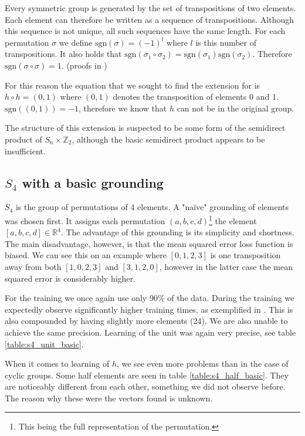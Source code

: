 Every symmetric group is generated by the set of transpositions of two elements. Each element can therefore be written as a sequence of transpositions. Although this sequence is not unique, all such sequences have the same length. For each permutation $\sigma$ we define $\text{sgn}(\sigma)=(-1)^l$ where $l$ is this number of transpositions. It also holds that $\text{sgn}(\sigma_1\circ\sigma_2)=\text{sgn}(\sigma_1)\text{sgn}(\sigma_2)$. Therefore $\text{sgn}(\sigma\circ\sigma)=1$. (proofs in \cite{Lingebra})

For this reason the equation that we sought to find the extension for is $h\circ h=(0,1)$ where $(0,1)$ denotes the transposition of elements $0$ and $1$. $\text{sgn}((0,1))=-1$, therefore we know that $h$ can not be in the original group. 

The structure of this extension is suspected to be some form of the semidirect product of $S_n\times\mathbb{Z}_2$, although the basic semidirect product appears to be insufficient.

\subsection{$S_4$ with a basic grounding}

$S_4$ is the group of permutations of 4 elements. A "na\"{i}ve" grounding of elements was chosen first. It assigns each permutation $(a,b,c,d)$\footnote{This being the full representation of the permutation.} the element $[a,b,c,d]\in\mathbb{R}^4$. The advantage of this grounding is its simplicity and shortness. The main disadvantage, however, is that the mean squared error loss function is biased. We can see this on an example where $[0,1,2,3]$ is one transposition away from both $[1,0,2,3]$ and $[3,1,2,0]$, however in the latter case the mean squared error is considerably higher. 

For the training we once again use only 90\% of the data. During the training we expectedly observe significantly higher training times, as exemplified in . This is also compounded by having slightly more elements (24). We are also unable to achieve the same precision. Learning of the unit was again very precise, see table \ref{table:s4_unit_basic}.

When it comes to learning of $h$, we see even more problems than in the case of cyclic groups. Some half elements are seen in table \ref{table:s4_half_basic}. They are noticeably different from each other, something we did not observe before. The reason why these were the vectors found is unknown. 

